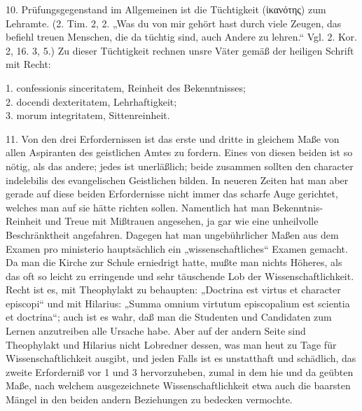 10. Prüfungsgegenstand im Allgemeinen ist die Tüchtigkeit (ἱκανότης) zum Lehramte. (2. Tim. 2, 2. „Was du von mir gehört hast durch viele Zeugen, das befiehl treuen Menschen, die da tüchtig sind, auch Andere zu lehren.“ Vgl. 2. Kor. 2, 16. 3, 5.) Zu dieser Tüchtigkeit rechnen unsre Väter gemäß der heiligen Schrift mit Recht:

1. confessionis sinceritatem, Reinheit des Bekenntnisses;\\
2. docendi dexteritatem, Lehrhaftigkeit;\\
3. morum integritatem, Sittenreinheit.

11. Von den drei Erfordernissen ist das erste und dritte in gleichem Maße von allen Aspiranten des geistlichen Amtes zu fordern. Eines von diesen beiden ist so nötig, als das andere; jedes ist unerläßlich; beide zusammen sollten den character indelebilis des evangelischen Geistlichen bilden. In neueren Zeiten hat man aber gerade auf diese beiden Erfordernisse nicht immer das scharfe Auge gerichtet, welches man auf sie hätte richten sollen. Namentlich hat man Bekenntnis-Reinheit und Treue mit Mißtrauen angesehen, ja gar wie eine unheilvolle Beschränktheit angefahren. Dagegen hat man ungebührlicher Maßen aus dem Examen pro ministerio hauptsächlich ein „wissenschaftliches“ Examen gemacht. Da man die Kirche
zur Schule erniedrigt hatte, mußte man nichts Höheres, als das oft so leicht zu erringende und sehr täuschende Lob der Wissenschaftlichkeit. Recht ist es, mit Theophylakt zu behaupten: „Doctrina est virtus et character episcopi“ und mit Hilarius: „Summa omnium virtutum episcopalium est scientia et doctrina“; auch ist es wahr, daß man die Studenten und Candidaten zum Lernen anzutreiben alle Ursache habe. Aber auf der andern Seite sind Theophylakt und Hilarius nicht Lobredner dessen, was man heut zu Tage für Wissenschaftlichkeit ausgibt, und jeden Falls ist es unstatthaft und schädlich, das zweite Erforderniß vor 1 und 3 hervorzuheben, zumal in dem hie und da geübten Maße, nach welchem ausgezeichnete Wissenschaftlichkeit etwa auch die baarsten Mängel in den beiden andern Beziehungen zu bedecken vermochte.

